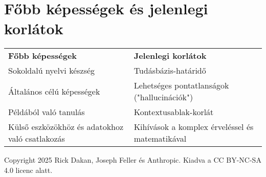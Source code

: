 \documentclass[a4paper, 11pt]{article}
\begin{document}
\section*{Főbb képességek és jelenlegi korlátok}
\begin{tabular}{p{} p{}}
\textbf{Főbb képességek} & \textbf{Jelenlegi korlátok} \\
Sokoldalú nyelvi készség & Tudásbázis-határidő \\
Általános célú képességek & Lehetséges pontatlanságok ("hallucinációk") \\
Példából való tanulás & Kontextusablak-korlát \\
\parbox[t]{0.45\textwidth}{Külső eszközökhöz és adatokhoz való csatlakozás} & \parbox[t]{0.45\textwidth}{Kihívások a komplex érveléssel és matematikával} \\
\end{tabular}

\vspace{\fill}
\begin{center}
    \small{Copyright 2025 Rick Dakan, Joseph Feller és Anthropic. Kiadva a CC BY-NC-SA 4.0 licenc alatt.}
\end{center}
\end{document}
